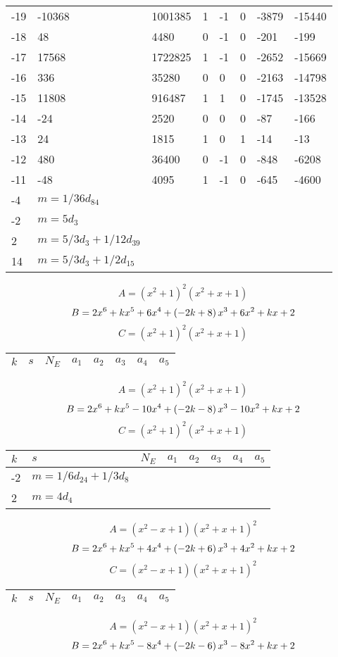 \documentclass{amsart}
\begin{document}
\begin{longtable}{|l|l|l|lllll|}
-19&-10368&1001385&1&-1&0&-3879&-15440\\
-18&48&4480&0&-1&0&-201&-199\\
-17&17568&1722825&1&-1&0&-2652&-15669\\
-16&336&35280&0&0&0&-2163&-14798\\
-15&11808&916487&1&1&0&-1745&-13528\\
-14&-24&2520&0&0&0&-87&-166\\
-13&24&1815&1&0&1&-14&-13\\
-12&480&36400&0&-1&0&-848&-6208\\
-11&-48&4095&1&-1&0&-645&-4600\\
-4&$m=1/36d_{84}$&&\multicolumn{5}{c|}{}\\
-2&$m=5d_{3}$&&\multicolumn{5}{c|}{}\\
2&$m=5/3d_{3}+1/12d_{39}$&&\multicolumn{5}{c|}{}\\
14&$m=5/3d_{3}+1/2d_{15}$&&\multicolumn{5}{c|}{}\\
\hline
\end{longtable}
$$A=(x^2
 + 1)^{2}(x^2
 + x
 + 1)$$
$$B=2\*x^6
 + k\*x^5
 + 6\*x^4
 + \left(-2\*k
 + 8\right) \*x^3
 + 6\*x^2
 + k\*x
 + 2$$
$$C=(x^2
 + 1)^{2}(x^2
 + x
 + 1)$$
\begin{longtable}{|l|l|l|lllll|}
\hline
$k$ & $s$ & $N_E$ & $a_1$ & $a_2$ & $a_3$ & $a_4$ & $a_5$\\
\hline
\hline
\end{longtable}
$$A=(x^2
 + 1)^{2}(x^2
 + x
 + 1)$$
$$B=2\*x^6
 + k\*x^5
 - 10\*x^4
 + \left(-2\*k
 - 8\right) \*x^3
 - 10\*x^2
 + k\*x
 + 2$$
$$C=(x^2
 + 1)^{2}(x^2
 + x
 + 1)$$
\begin{longtable}{|l|l|l|lllll|}
\hline
$k$ & $s$ & $N_E$ & $a_1$ & $a_2$ & $a_3$ & $a_4$ & $a_5$\\
\hline
-2&$m=1/6d_{24}+1/3d_{8}$&&\multicolumn{5}{c|}{}\\
2&$m=4d_{4}$&&\multicolumn{5}{c|}{}\\
\hline
\end{longtable}
$$A=(x^2
 - x
 + 1)(x^2
 + x
 + 1)^{2}$$
$$B=2\*x^6
 + k\*x^5
 + 4\*x^4
 + \left(-2\*k
 + 6\right) \*x^3
 + 4\*x^2
 + k\*x
 + 2$$
$$C=(x^2
 - x
 + 1)(x^2
 + x
 + 1)^{2}$$
\begin{longtable}{|l|l|l|lllll|}
\hline
$k$ & $s$ & $N_E$ & $a_1$ & $a_2$ & $a_3$ & $a_4$ & $a_5$\\
\hline
\hline
\end{longtable}
$$A=(x^2
 - x
 + 1)(x^2
 + x
 + 1)^{2}$$
$$B=2\*x^6
 + k\*x^5
 - 8\*x^4
 + \left(-2\*k
 - 6\right) \*x^3
 - 8\*x^2
 + k\*x
 + 2$$
\end{document}
